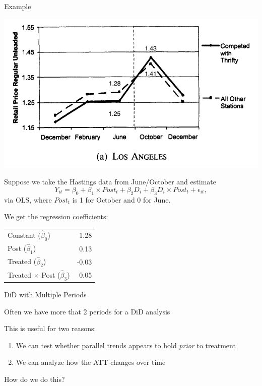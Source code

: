 \documentclass[11pt,english,handout]{beamer}
\newenvironment{wideitemize}{\itemize\addtolength{\itemsep}{10pt}}{\enditemize}
\begin{document}
\begin{frame}{Example}

\begin{center}
\includegraphics[width = 0.5\linewidth]{hastings-event-study-w-labels}
\end{center}
\begin{wideitemize}


\item
Suppose we take the Hastings data from June/October and estimate
$$Y_{it} = \beta_0 + \beta_1 \times Post_t + \beta_2 D_i + \beta_3 D_i \times Post_t + \epsilon_{it},$$
\noindent via OLS, where $Post_t$ is 1 for October and 0 for June. 

\pause
\item
We get the regression coefficients:
\begin{tabular}{lr}
Constant ($\hat\beta_0$) & 1.28 \\
Post ($\hat\beta_1$) & 0.13 \\
Treated ($\hat\beta_2$) & -0.03 \\
Treated $\times$ Post ($\hat\beta_3$) & 0.05
\end{tabular}
\end{wideitemize}	
\end{frame}


\begin{frame}{DiD with Multiple Periods}
	
	\begin{wideitemize}
		\item
		Often we have more that 2 periods for a DiD analysis\pause{}
		
		\item
		This is useful for two reasons: \pause{}
		
		\begin{enumerate}
			\item 
			We can test whether parallel trends appears to hold \textit{prior} to treatment\pause{}
			
			\pause
			\item
			We can analyze how the ATT changes over time \pause{}
		\end{enumerate}


		\item
		How do we do this? 

	\end{wideitemize}
\end{frame}
\end{document}
